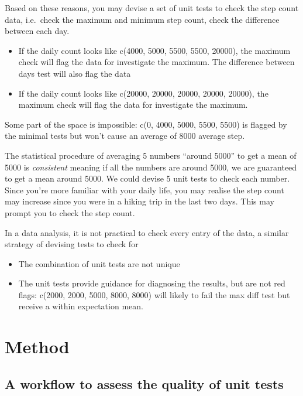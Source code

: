 \documentclass[
]{jds}
\providecommand{\tightlist}{%
  \setlength{\itemsep}{0pt}\setlength{\parskip}{0pt}}\usepackage{longtable,booktabs,array}
\begin{document}
Based on these reasons, you may devise a set of unit tests to check the
step count data, i.e.~check the maximum and minimum step count, check
the difference between each day.

\begin{itemize}
\tightlist
\item
  If the daily count looks like c(4000, 5000, 5500, 5500, 20000), the
  maximum check will flag the data for investigate the maximum. The
  difference between days test will also flag the data
\item
  If the daily count looks like c(20000, 20000, 20000, 20000, 20000),
  the maximum check will flag the data for investigate the maximum.
\end{itemize}

Some part of the space is impossible: c(0, 4000, 5000, 5500, 5500) is
flagged by the minimal tests but won't cause an average of 8000 average
step.

The statistical procedure of averaging 5 numbers ``around 5000'' to get
a mean of 5000 is \emph{consistent} meaning if all the numbers are
around 5000, we are guaranteed to get a mean around 5000. We could
devise 5 unit tests to check each number. Since you're more familiar
with your daily life, you may realise the step count may increase since
you were in a hiking trip in the last two days. This may prompt you to
check the step count.

In a data analysis, it is not practical to check every entry of the
data, a similar strategy of devising tests to check for

\begin{itemize}
\tightlist
\item
  The combination of unit tests are not unique
\item
  The unit tests provide guidance for diagnosing the results, but are
  not red flags: c(2000, 2000, 5000, 8000, 8000) will likely to fail the
  max diff test but receive a within expectation mean.
\end{itemize}

\section{Method}\label{method}

\subsection{A workflow to assess the quality of unit
tests}\label{a-workflow-to-assess-the-quality-of-unit-tests}
\end{document}
